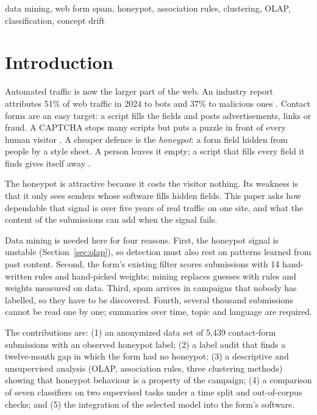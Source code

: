 \documentclass[conference]{IEEEtran}
\begin{document}
\begin{IEEEkeywords}
data mining, web form spam, honeypot, association rules, clustering, OLAP, classification, concept drift
\end{IEEEkeywords}

\section{Introduction}

Automated traffic is now the larger part of the web. An industry report attributes 51\% of web traffic in 2024
to bots and 37\% to malicious ones \cite{imperva2025}. Contact forms are an easy target: a script fills the
fields and posts advertisements, links or fraud. A CAPTCHA stops many scripts but puts a puzzle in front of
every human visitor \cite{vonahn2003}. A cheaper defence is the \emph{honeypot}: a form field hidden from
people by a style sheet. A person leaves it empty; a script that fills every field it finds gives itself away
\cite{spitzner2002,geerling2011}.

The honeypot is attractive because it costs the visitor nothing. Its weakness is that it only sees senders
whose software fills hidden fields. This paper asks how dependable that signal is over five years of real
traffic on one site, and what the content of the submissions can add when the signal fails.

Data mining is needed here for four reasons. First, the honeypot signal is unstable (Section~\ref{sec:olap}),
so detection must also rest on patterns learned from past content. Second, the form's existing filter scores
submissions with 14 hand-written rules and hand-picked weights; mining replaces guesses with rules and weights
measured on data. Third, spam arrives in campaigns that nobody has labelled, so they have to be discovered.
Fourth, several thousand submissions cannot be read one by one; summaries over time, topic and language are
required.

The contributions are: (1) an anonymized data set of 5,439 contact-form submissions with an observed honeypot
label; (2) a label audit that finds a twelve-month gap in which the form had no honeypot; (3) a descriptive and
unsupervised analysis (OLAP, association rules, three clustering methods) showing that honeypot behaviour is a
property of the campaign; (4) a comparison of seven classifiers on two supervised tasks under a time split and
out-of-corpus checks; and (5) the integration of the selected model into the form's software.
\end{document}

